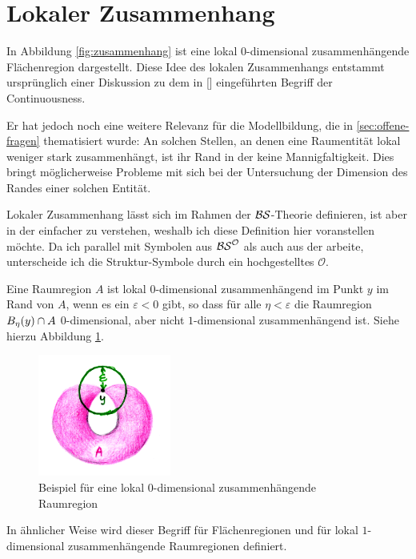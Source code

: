 \section{Lokaler Zusammenhang}\label{sec:lok-zusammenhang}

    In Abbildung \ref{fig:zusammenhang} ist 
    eine lokal $0$-dimensional zusammenhängende Flächenregion dargestellt.
    Diese Idee des lokalen Zusammenhangs entstammt ursprünglich einer Diskussion zu dem in [\cite{baumann-r-2019--a}] eingeführten Begriff der Continuousness.

    Er hat jedoch noch eine weitere Relevanz für die Modellbildung, die in \ref{sec:offene-fragen} thematisiert wurde:
    An solchen Stellen, an denen eine Raumentität lokal weniger stark zusammenhängt, ist ihr Rand in der \strukt keine Mannigfaltigkeit.
    Dies bringt möglicherweise Probleme mit sich bei der Untersuchung der Dimension des Randes einer solchen Entität.

    Lokaler Zusammenhang lässt sich im Rahmen der $\mathcal{BS}$-Theorie definieren, ist aber in der \strukt einfacher zu verstehen, weshalb ich diese Definition hier voranstellen möchte.
    Da ich parallel mit Symbolen aus $\mathcal{BS}^{\mathcal{O}}$ als auch aus der \strukt arbeite, unterscheide ich die Struktur-Symbole durch ein hochgestelltes $\mathcal{O}$.

    Eine Raumregion $A$ ist lokal $0$-dimensional zusammenhängend im Punkt $y$ im Rand von $A$, wenn es ein $\varepsilon < 0$ gibt, so dass für alle $\eta < \varepsilon$ die Raumregion $B_{\eta}(y) \cap A$ $0$-dimensional, aber nicht $1$-dimensional zusammenhängend ist. Siehe hierzu Abbildung \ref{fig:loc0dc}.
    
    \begin{figure}[ht]
        \centering
        \includegraphics[height=4cm]{abb/loc0dc.png}
        \caption{Beispiel für eine lokal $0$-dimensional zusammenhängende Raumregion}
        \label{fig:loc0dc}
    \end{figure}
    
    In ähnlicher Weise wird dieser Begriff für Flächenregionen und für lokal $1$-dimensional zusammenhängende Raumregionen definiert.

